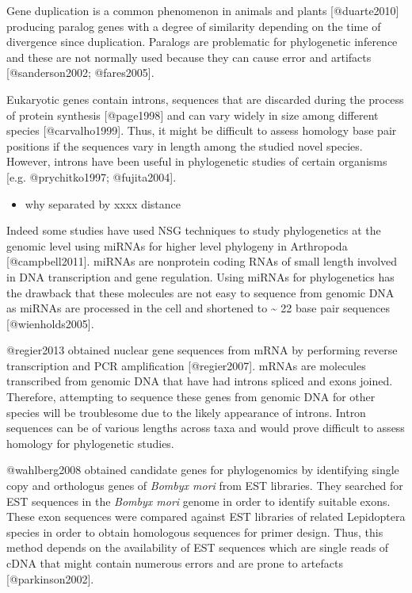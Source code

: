 \documentclass[]{article}
\begin{document}
Gene duplication is a common phenomenon in animals and plants
{[}@duarte2010{]} producing paralog genes with a degree of similarity
depending on the time of divergence since duplication. Paralogs are
problematic for phylogenetic inference and these are not normally used
because they can cause error and artifacts {[}@sanderson2002;
@fares2005{]}.

Eukaryotic genes contain introns, sequences that are discarded during
the process of protein synthesis {[}@page1998{]} and can vary widely in
size among different species {[}@carvalho1999{]}. Thus, it might be
difficult to assess homology base pair positions if the sequences vary
in length among the studied novel species. However, introns have been
useful in phylogenetic studies of certain organisms {[}e.g.
@prychitko1997; @fujita2004{]}.

\begin{itemize}
\item
  why separated by xxxx distance
\end{itemize}

Indeed some studies have used NSG techniques to study phylogenetics at
the genomic level using miRNAs for higher level phylogeny in Arthropoda
{[}@campbell2011{]}. miRNAs are nonprotein coding RNAs of small length
involved in DNA transcription and gene regulation. Using miRNAs for
phylogenetics has the drawback that these molecules are not easy to
sequence from genomic DNA as miRNAs are processed in the cell and
shortened to \textasciitilde{} 22 base pair sequences
{[}@wienholds2005{]}.

@regier2013 obtained nuclear gene sequences from mRNA by performing
reverse transcription and PCR amplification {[}@regier2007{]}. mRNAs are
molecules transcribed from genomic DNA that have had introns spliced and
exons joined. Therefore, attempting to sequence these genes from genomic
DNA for other species will be troublesome due to the likely appearance
of introns. Intron sequences can be of various lengths across taxa and
would prove difficult to assess homology for phylogenetic studies.

@wahlberg2008 obtained candidate genes for phylogenomics by identifying
single copy and orthologus genes of \emph{Bombyx mori} from EST
libraries. They searched for EST sequences in the \emph{Bombyx mori}
genome in order to identify suitable exons. These exon sequences were
compared against EST libraries of related Lepidoptera species in order
to obtain homologous sequences for primer design. Thus, this method
depends on the availability of EST sequences which are single reads of
cDNA that might contain numerous errors and are prone to artefacts
{[}@parkinson2002{]}.
\end{document}
